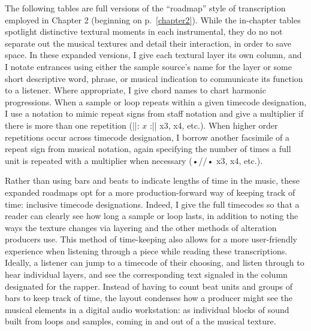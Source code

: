 \onehalfspacing
\appendix \label{appendix:fullroadmaps}
\renewcommand{\thetable}{A.\arabic{table}}
\setcounter{table}{0}

The following tables are full versions of the ``roadmap'' style of transcription employed in
Chapter 2 (beginning on p.~\ref{chapter2}). While the in-chapter tables spotlight distinctive 
textural moments in each instrumental, they do no not separate out the musical textures and 
detail their interaction, in order to save space. In these expanded versions, I give each 
textural layer its own column, and I notate entrances using either the sample source's name 
for the layer or some short descriptive word, phrase, or musical indication to communicate 
its function to a listener. Where appropriate, I give chord names to chart harmonic progressions. 
When a sample or loop repeats within a given timecode designation, I use a notation to mimic 
repeat signs from staff notation and give a multiplier if there is more than one repetition 
(||: $x$ :|| x3, x4, etc.). When higher order repetitions occur across timecode designation, 
I borrow another facsimile of a repeat sign from musical notation, again specifying the 
number of times a full unit is repeated with a multiplier when necessary (•//• x3, x4, etc.).

Rather than using bars and beats to indicate lengths of time in the music, these expanded 
roadmaps opt for a more production-forward way of keeping track of time: inclusive timecode 
designations. Indeed, I give the full timecodes so that a reader can clearly see how long a 
sample or loop lasts, in addition to noting the ways the texture changes via layering and 
the other methods of alteration producers use. This method of time-keeping also allows for 
a more user-friendly experience when listening through a piece while reading these transcriptions. 
Ideally, a listener can jump to a timecode of their choosing, and listen through to hear 
individual layers, and see the corresponding text signaled in the column designated for the 
rapper. Instead of having to count beat units and groups of bars to keep track of time, the 
layout condenses how a producer might see the musical elements in a digital audio workstation: 
as individual blocks of sound built from loops and samples, coming in and out of a the 
musical texture.


